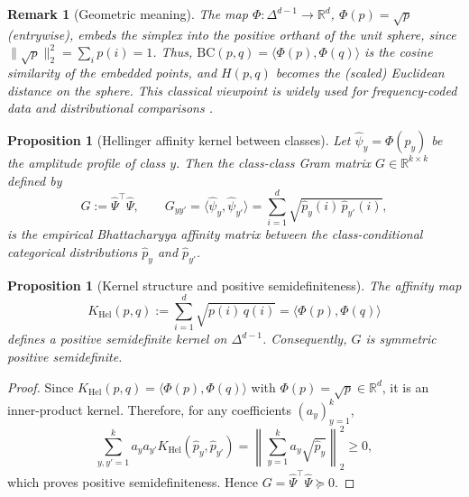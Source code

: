 \documentclass[preprint,11pt]{elsarticle}
\newtheorem{Proposition}[Theorem]{Proposition}
\newtheorem{Remark}[Theorem]{Remark}
\newcommand{\R}{\mathbb{R}}
\begin{document}
\begin{Remark}[Geometric meaning]
The map $\Phi:\Delta^{d-1}\to\R^d$, $\Phi(p)=\sqrt{p}$ (entrywise), embeds the simplex into the positive orthant of the unit sphere,
since $\|\sqrt{p}\|_2^2=\sum_i p(i)=1$.
Thus, $\mathrm{BC}(p,q)=\langle \Phi(p),\Phi(q)\rangle$ is the cosine similarity of the embedded points,
and $H(p,q)$ becomes the (scaled) Euclidean distance on the sphere. This classical viewpoint is widely used for frequency-coded data
and distributional comparisons \cite{Bhattacharyya1943,Aherne1998}.
\end{Remark}

\begin{Proposition}[Hellinger affinity kernel between classes]
\label{char:hellinger_kernel}
Let $\widehat\psi_y=\Phi(\widehat p_y)$ be the amplitude profile of class $y$.
Then the class-class Gram matrix $G\in\R^{k\times k}$ defined by
\[
G := \widehat\Psi^\top\widehat\Psi,\qquad
G_{yy'} = \langle \widehat\psi_y,\widehat\psi_{y'}\rangle
= \sum_{i=1}^d \sqrt{\widehat p_y(i)\,\widehat p_{y'}(i)},
\]
is the empirical Bhattacharyya affinity matrix between the class-conditional categorical distributions
$\widehat p_y$ and $\widehat p_{y'}$.
\end{Proposition}

\begin{Proposition}[Kernel structure and positive semidefiniteness]
\label{prop:hellinger_kernel_psd}
The affinity map
\[
K_{\mathrm{Hel}}(p,q):=\sum_{i=1}^d\sqrt{p(i)\,q(i)} = \langle \Phi(p),\Phi(q)\rangle
\]
defines a positive semidefinite kernel on $\Delta^{d-1}$.
Consequently, $G$ is symmetric positive semidefinite.
\end{Proposition}

\begin{proof}
Since $K_{\mathrm{Hel}}(p,q)=\langle \Phi(p),\Phi(q)\rangle$ with $\Phi(p)=\sqrt{p}\in\R^d$, it is an inner-product kernel.
Therefore, for any coefficients $(a_y)_{y=1}^k$,
\[
\sum_{y,y'=1}^k a_y a_{y'} K_{\mathrm{Hel}}(\widehat p_y,\widehat p_{y'})
=
\left\|\sum_{y=1}^k a_y \sqrt{\widehat p_y}\right\|_2^2 \ge 0,
\]
which proves positive semidefiniteness. Hence $G=\widehat\Psi^\top\widehat\Psi\succeq 0$.
\end{proof}
\end{document}
